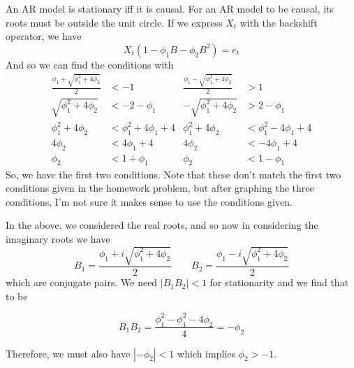 \documentclass[10pt,a4paper]{exam}
\begin{document}
\begin{questions}

\begin{solution}
An AR model is stationary iff it is causal. For an AR model to be causal, its roots must be outside the unit circle. If we express $X_t$ with the backshift operator, we have
$$X_t(1- \phi_1 B - \phi_2 B^2) = e_t$$
And so we can find the conditions with
\begin{align*}
\frac{\phi_1 + \sqrt{\phi_1^2 + 4\phi_2}}{2} &< -1			& \frac{\phi_1 - \sqrt{\phi_1^2 + 4\phi_2}}{2} &> 1\\
\sqrt{\phi_1^2 + 4\phi_2} 		&< -2 - \phi_1						& -\sqrt{\phi_1^2 + 4\phi_2} &> 2 - \phi_1\\
\phi_1^2 + 4\phi_2 		&< \phi_1^2 + 4\phi_1 + 4					& \phi_1^2 + 4\phi_2 &< \phi_1^2 - 4\phi_1 + 4\\
4\phi_2 &< 4\phi_1 + 4					& 4\phi_2 &< -4\phi_1 + 4\\
\phi_2 &< 1 + \phi_1					& \phi_2 &< 1 - \phi_1
\end{align*}
So, we have the first two conditions. Note that these don't match the first two conditions given in the homework problem, but after graphing the three conditions, I'm not sure it makes sense to use the conditions given.

In the above, we considered the real roots, and so now in considering the imaginary roots we have
$$B_1 = \frac{\phi_1 + i\sqrt{\phi_1^2 + 4\phi_2}}{2} \quad \quad B_2 = \frac{\phi_1 - i\sqrt{\phi_1^2 + 4\phi_2}}{2}$$
which are conjugate pairs. We need $|B_1B_2| < 1$ for stationarity and we find that to be

$$B_1B_2 = \frac{\phi_1^2 - \phi_1^2 - 4\phi_2}{4} = -\phi_2$$

Therefore, we must also have $|-\phi_2| < 1$ which implies $\phi_2 > -1$.

\end{solution}
\end{questions}
\end{document}

